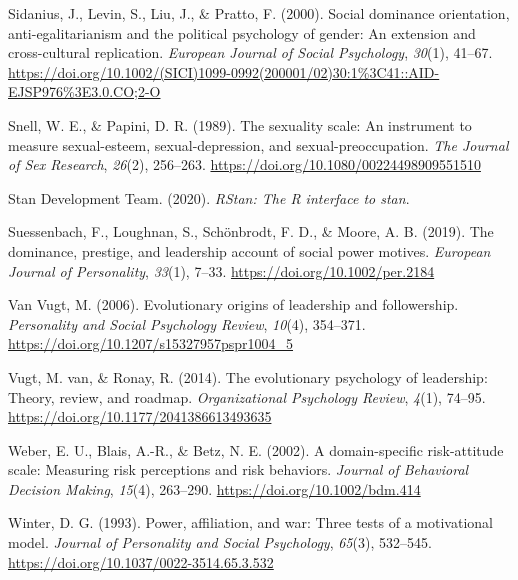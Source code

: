 \documentclass[
  donotrepeattitle,doc, 12pt, a4paper,floatsintext]{apa7}
\newlength{\cslhangindent}
\newlength{\cslentryspacingunit} %
\newenvironment{CSLReferences}[2] %
 {%
  \setlength{\parindent}{0pt}
  \ifodd #1
  \let\oldpar\par
  \def\par{\hangindent=\cslhangindent\oldpar}
  \fi
  \setlength{\parskip}{#2\cslentryspacingunit}
 }%
 {}
\begin{document}
\begin{CSLReferences}{1}{0}
\leavevmode{}%
Sidanius, J., Levin, S., Liu, J., \& Pratto, F. (2000). Social dominance orientation, anti-egalitarianism and the political psychology of gender: An extension and cross-cultural replication. \emph{European Journal of Social Psychology}, \emph{30}(1), 41--67. \url{https://doi.org/10.1002/(SICI)1099-0992(200001/02)30:1\%3C41::AID-EJSP976\%3E3.0.CO;2-O}

\leavevmode{}%
Snell, W. E., \& Papini, D. R. (1989). The sexuality scale: An instrument to measure sexual-esteem, sexual-depression, and sexual-preoccupation. \emph{The Journal of Sex Research}, \emph{26}(2), 256--263. \url{https://doi.org/10.1080/00224498909551510}

\leavevmode{}%
Stan Development Team. (2020). \emph{{RStan}: The {R} interface to stan}.

\leavevmode{}%
Suessenbach, F., Loughnan, S., Schönbrodt, F. D., \& Moore, A. B. (2019). The dominance, prestige, and leadership account of social power motives. \emph{European Journal of Personality}, \emph{33}(1), 7--33. \url{https://doi.org/10.1002/per.2184}

\leavevmode{}%
Van Vugt, M. (2006). Evolutionary origins of leadership and followership. \emph{Personality and Social Psychology Review}, \emph{10}(4), 354--371. \url{https://doi.org/10.1207/s15327957pspr1004_5}

\leavevmode{}%
Vugt, M. van, \& Ronay, R. (2014). The evolutionary psychology of leadership: Theory, review, and roadmap. \emph{Organizational Psychology Review}, \emph{4}(1), 74--95. \url{https://doi.org/10.1177/2041386613493635}

\leavevmode{}%
Weber, E. U., Blais, A.-R., \& Betz, N. E. (2002). A domain-specific risk-attitude scale: Measuring risk perceptions and risk behaviors. \emph{Journal of Behavioral Decision Making}, \emph{15}(4), 263--290. \url{https://doi.org/10.1002/bdm.414}

\leavevmode{}%
Winter, D. G. (1993). Power, affiliation, and war: Three tests of a motivational model. \emph{Journal of Personality and Social Psychology}, \emph{65}(3), 532--545. \url{https://doi.org/10.1037/0022-3514.65.3.532}


\end{CSLReferences}
\end{document}
